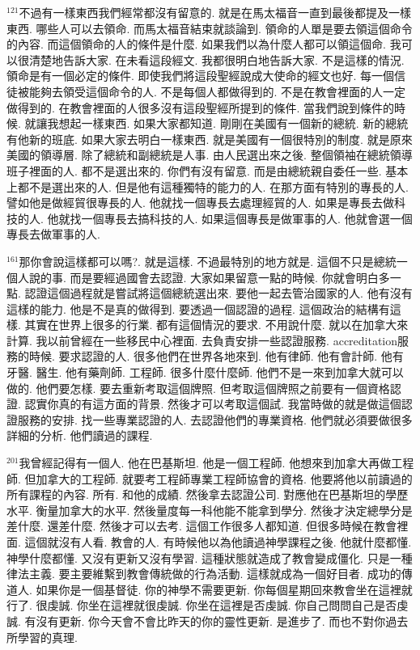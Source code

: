 \documentclass{book}
\begin{document}
$^{121}$不過有一樣東西我們經常都沒有留意的.
就是在馬太福音一直到最後都提及一樣東西.
哪些人可以去領命.
而馬太福音結束就談論到.
領命的人單是要去領這個命令的內容.
而這個領命的人的條件是什麼.
如果我們以為什麼人都可以領這個命.
我可以很清楚地告訴大家.
在未看這段經文.
我都很明白地告訴大家.
不是這樣的情況.
領命是有一個必定的條件.
即使我們將這段聖經說成大使命的經文也好.
每一個信徒被能夠去領受這個命令的人.
不是每個人都做得到的.
不是在教會裡面的人一定做得到的.
在教會裡面的人很多沒有這段聖經所提到的條件.
當我們說到條件的時候.
就讓我想起一樣東西.
如果大家都知道.
剛剛在美國有一個新的總統.
新的總統有他新的班底.
如果大家去明白一樣東西.
就是美國有一個很特別的制度.
就是原來美國的領導層.
除了總統和副總統是人事.
由人民選出來之後.
整個領袖在總統領導班子裡面的人.
都不是選出來的.
你們有沒有留意.
而是由總統親自委任一些.
基本上都不是選出來的人.
但是他有這種獨特的能力的人.
在那方面有特別的專長的人.
譬如他是做經貿很專長的人.
他就找一個專長去處理經貿的人.
如果是專長去做科技的人.
他就找一個專長去搞科技的人.
如果這個專長是做軍事的人.
他就會選一個專長去做軍事的人.

$^{161}$那你會說這樣都可以嗎?.
就是這樣.
不過最特別的地方就是.
這個不只是總統一個人說的事.
而是要經過國會去認證.
大家如果留意一點的時候.
你就會明白多一點.
認證這個過程就是嘗試將這個總統選出來.
要他一起去管治國家的人.
他有沒有這樣的能力.
他是不是真的做得到.
要透過一個認證的過程.
這個政治的結構有這樣.
其實在世界上很多的行業.
都有這個情況的要求.
不用說什麼.
就以在加拿大來計算.
我以前曾經在一些移民中心裡面.
去負責安排一些認證服務.
accreditation服務的時候.
要求認證的人.
很多他們在世界各地來到.
他有律師.
他有會計師.
他有牙醫.
醫生.
他有藥劑師.
工程師.
很多什麼什麼師.
他們不是一來到加拿大就可以做的.
他們要怎樣.
要去重新考取這個牌照.
但考取這個牌照之前要有一個資格認證.
認實你真的有這方面的背景.
然後才可以考取這個試.
我當時做的就是做這個認證服務的安排.
找一些專業認證的人.
去認證他們的專業資格.
他們就必須要做很多詳細的分析.
他們讀過的課程.

$^{201}$我曾經記得有一個人.
他在巴基斯坦.
他是一個工程師.
他想來到加拿大再做工程師.
但加拿大的工程師.
就要考工程師專業工程師協會的資格.
他要將他以前讀過的所有課程的內容.
所有.
和他的成績.
然後拿去認證公司.
對應他在巴基斯坦的學歷水平.
衡量加拿大的水平.
然後量度每一科他能不能拿到學分.
然後才決定總學分是差什麼.
還差什麼.
然後才可以去考.
這個工作很多人都知道.
但很多時候在教會裡面.
這個就沒有人看.
教會的人.
有時候他以為他讀過神學課程之後.
他就什麼都懂.
神學什麼都懂.
又沒有更新又沒有學習.
這種狀態就造成了教會變成僵化.
只是一種律法主義.
要主要維繫到教會傳統做的行為活動.
這樣就成為一個好目者.
成功的傳道人.
如果你是一個基督徒.
你的神學不需要更新.
你每個星期回來教會坐在這裡就行了.
很虔誠.
你坐在這裡就很虔誠.
你坐在這裡是否虔誠.
你自己問問自己是否虔誠.
有沒有更新.
你今天會不會比昨天的你的靈性更新.
是進步了.
而也不對你過去所學習的真理.
\end{document}
